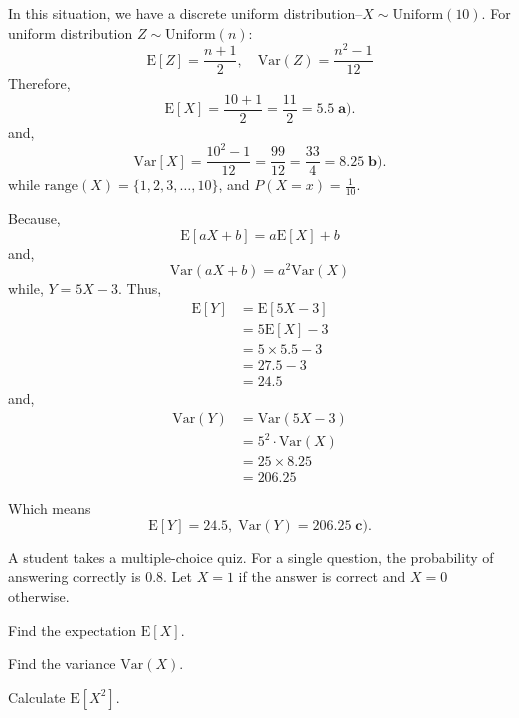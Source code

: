 \documentclass[a4paper, 10pt]{article}
\begin{document}
\begin{solution}
	In this situation, we have a discrete uniform distribution--\( X \sim \text{Uniform}(10) \).
	For uniform distribution \( Z \sim \text{Uniform}(n) \):
	\[
		\text{E}[Z] = \frac{n + 1}{2}, \quad \text{Var}(Z) = \frac{n^2 - 1}{12}
	\]
	Therefore,
	\[
		\text{E}[X] = \frac{10 + 1}{2} = \frac{11}{2} = \boxed{5.5} \; \textbf{a).}
	\]
	and,
	\[
		\text{Var}[X] = \frac{10^2 - 1}{12} = \frac{99}{12} = \frac{33}{4} = \boxed{8.25} \; \textbf{b).}
	\]
	while \( \text{range}(X) = \{1, 2, 3, \dots, 10\} \), and \( P(X = x) = \frac{1}{10} \).

	\myspace

	Because,
	\[
		\text{E}[aX + b] = a\text{E}[X] + b
	\]
	and,
	\[
		\text{Var}(aX + b) = a^2 \text{Var}(X)
	\]
	while, \( Y = 5X - 3 \). Thus,
	\begin{align*}
		\text{E}[Y] & = \text{E}[5X - 3] \\
		            & = 5\text{E}[X] - 3 \\
		            & = 5 \times 5.5 - 3 \\
		            & = 27.5 - 3         \\
		            & = 24.5
	\end{align*}
	and,
	\begin{align*}
		\text{Var}(Y) & = \text{Var}(5X - 3)      \\
		              & = 5^2 \cdot \text{Var}(X) \\
		              & = 25 \times 8.25          \\
		              & = 206.25
	\end{align*}

	Which means
	\[\boxed{
			\text{E}[Y] = 24.5, \; \text{Var}(Y) = 206.25
		} \; \textbf{c).} \]
\end{solution}

\begin{problem}
A student takes a multiple-choice quiz. For a single question, the probability of answering correctly is 0.8.
Let \( X = 1 \) if the answer is correct and \( X = 0 \) otherwise.
\begin{subproblems_alpha}
	\item Find the expectation \( \text{E}[X] \).
	\item Find the variance \( \text{Var}(X) \).
	\item Calculate \( \text{E}[X^2] \).
\end{subproblems_alpha}
\end{problem}
\end{document}
